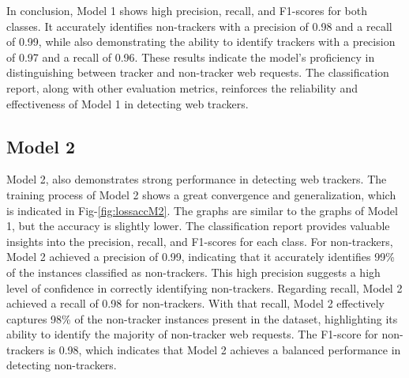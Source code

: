 In conclusion, Model 1 shows high precision, recall, and F1-scores for both classes. It accurately identifies non-trackers
with a precision of 0.98 and a recall of 0.99, while also demonstrating the ability to identify trackers with a precision of 0.97
and a recall of 0.96. These results indicate the model's proficiency in distinguishing between tracker and non-tracker web requests.
The classification report, along with other evaluation metrics, reinforces the reliability and effectiveness of Model 1 in detecting
web trackers.

\subsection{Model 2}

Model 2, also demonstrates strong performance in detecting web trackers. The training process of Model 2 shows a great convergence 
and generalization, which is indicated in Fig-\ref{fig:lossaccM2}. The graphs are similar to the graphs of Model 1, but the accuracy
is slightly lower. The classification
report provides valuable insights into the precision, recall, and F1-scores for each class. For non-trackers, Model 2
achieved a precision of 0.99, indicating that it accurately identifies 99\% of the instances classified as non-trackers.
This high precision suggests a high level of confidence in correctly identifying non-trackers. 
Regarding recall, Model 2 achieved a recall of 0.98 for non-trackers. With that recall, Model 2 effectively captures 98\% of
the non-tracker instances present in the dataset, highlighting its ability to identify the majority of non-tracker web requests.
The F1-score for non-trackers is 0.98, which indicates that Model 2 achieves a balanced performance
in detecting non-trackers.

